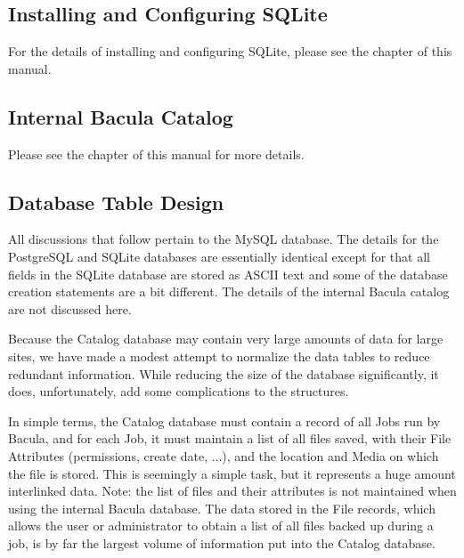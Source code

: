{{{\subsection{Installing and Configuring SQLite}

For the details of installing and configuring SQLite, please see the 
 chapter of
this manual. 

\subsection{Internal Bacula Catalog}

Please see the 
 chapter of this
manual for more details. 

\subsection{Database Table Design}

All discussions that follow pertain to the MySQL database. The details for the
PostgreSQL and SQLite databases are essentially identical except for that all
fields in the SQLite database are stored as ASCII text and some of the
database creation statements are a bit different. The details of the internal
Bacula catalog are not discussed here. 

Because the Catalog database may contain very large amounts of data for large
sites, we have made a modest attempt to normalize the data tables to reduce
redundant information. While reducing the size of the database significantly,
it does, unfortunately, add some complications to the structures. 

In simple terms, the Catalog database must contain a record of all Jobs run by
Bacula, and for each Job, it must maintain a list of all files saved, with
their File Attributes (permissions, create date, ...), and the location and
Media on which the file is stored. This is seemingly a simple task, but it
represents a huge amount interlinked data. Note: the list of files and their
attributes is not maintained when using the internal Bacula database. The data
stored in the File records, which allows the user or administrator to obtain a
list of all files backed up during a job, is by far the largest volume of
information put into the Catalog database. 

}}}
